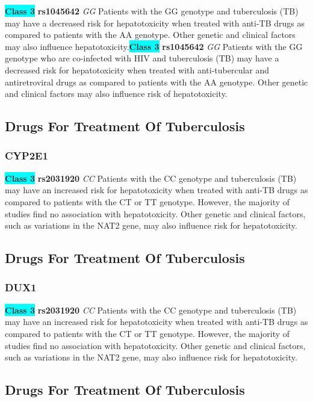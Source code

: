 \documentclass{book}
\begin{document}
\begin{center}
\textbf{\colorbox{cyan} {Class 3}} \textbf{ rs1045642 } \textit{ GG }
Patients with the GG genotype and tuberculosis (TB) may have a decreased risk for hepatotoxicity when treated with anti-TB drugs as compared to patients with the AA genotype. Other genetic and clinical factors may also influence hepatotoxicity.\textbf{\colorbox{cyan} {Class 3}} \textbf{ rs1045642 } \textit{ GG }
Patients with the GG genotype who are co-infected with HIV and tuberculosis (TB) may have a decreased risk for hepatotoxicity when treated with anti-tubercular and antiretroviral drugs as compared to patients with the AA genotype. Other genetic and clinical factors may also influence risk of hepatotoxicity.


\end{center}\subsection{ Drugs For Treatment Of Tuberculosis }


\subsubsection{ CYP2E1 }

\begin{center}
\textbf{\colorbox{cyan} {Class 3}} \textbf{ rs2031920 } \textit{ CC }
Patients with the CC genotype and tuberculosis (TB) may have an increased risk for hepatotoxicity when treated with anti-TB drugs as compared to patients with the CT or TT genotype. However, the majority of studies find no association with hepatotoxicity. Other genetic and clinical factors, such as variations in the NAT2 gene, may also influence risk for hepatotoxicity.


\end{center}\subsection{ Drugs For Treatment Of Tuberculosis }


\subsubsection{ DUX1 }

\begin{center}
\textbf{\colorbox{cyan} {Class 3}} \textbf{ rs2031920 } \textit{ CC }
Patients with the CC genotype and tuberculosis (TB) may have an increased risk for hepatotoxicity when treated with anti-TB drugs as compared to patients with the CT or TT genotype. However, the majority of studies find no association with hepatotoxicity. Other genetic and clinical factors, such as variations in the NAT2 gene, may also influence risk for hepatotoxicity.


\end{center}\subsection{ Drugs For Treatment Of Tuberculosis }
\end{document}
